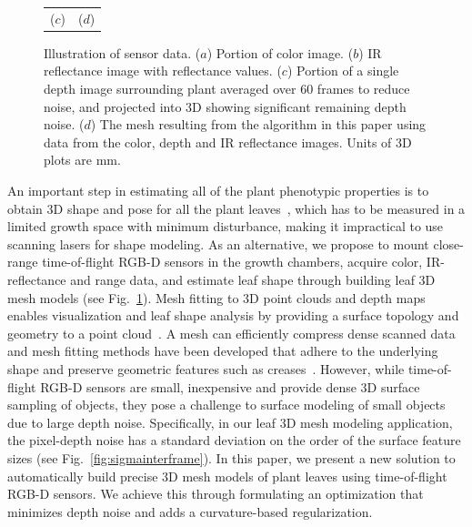 \begin{figure}
\begin{center}
\begin{tabular}{ c c }
($c$) & ($d$) \\
\end{tabular}
\end{center}
\caption{Illustration of sensor data.  ($a$) Portion of color image. ($b$) IR reflectance image with reflectance values. ($c$) Portion of a single depth image surrounding plant averaged over 60 frames to reduce noise, and projected into $3$D showing significant remaining depth noise. ($d$)  The mesh resulting from the algorithm in this paper using data from the color, depth and IR reflectance images.  Units of $3$D plots are mm.  }
\label{fig:plantnoise}
\end{figure}


An important step in estimating all of the plant phenotypic properties is to obtain $3$D shape and pose for all the plant leaves~\cite{muller2015leaf}, which has to be measured in a limited growth space with minimum disturbance, making it impractical to use scanning lasers for shape modeling. As an alternative, we propose to mount close-range time-of-flight RGB-D sensors in the growth chambers, acquire color, IR-reflectance and range data, and estimate leaf shape through building leaf $3$D mesh models (see Fig.~\ref{fig:plantnoise}). Mesh fitting to $3$D point clouds and depth maps enables visualization and leaf shape analysis by providing a surface topology and geometry to a point cloud~\cite{Sienz2000,Yeh2011}.  A mesh can efficiently compress dense scanned data and mesh fitting methods have been developed that adhere to the underlying shape and preserve geometric features such as creases~\cite{hoppe:1994,Kobbelt:1998}. 
%
However, while time-of-flight RGB-D sensors are small, inexpensive and provide dense $3$D surface sampling of objects, they pose a challenge to surface modeling of small objects due to large depth noise. Specifically, in our leaf $3$D mesh modeling application, the pixel-depth noise has a standard deviation on the order of the surface feature sizes (see Fig.~\ref{fig:sigmainterframe}). In this paper, we present a new solution to automatically build precise $3$D mesh models of plant leaves using time-of-flight RGB-D sensors. We achieve this through formulating an optimization that minimizes depth noise and adds a curvature-based regularization.  

